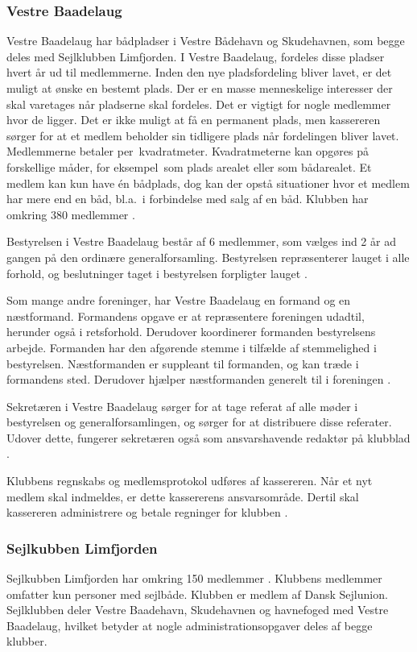 \subsubsection{Vestre Baadelaug}
Vestre Baadelaug har bådpladser i Vestre Bådehavn og Skudehavnen, som begge deles med Sejlklubben Limfjorden. I Vestre Baadelaug, fordeles disse pladser hvert år ud til medlemmerne. Inden den nye pladsfordeling bliver lavet, er det muligt at ønske en bestemt plads. Der er en masse menneskelige interesser der skal varetages når pladserne skal fordeles. Det er vigtigt for nogle medlemmer hvor de ligger. Det er ikke muligt at få en permanent plads, men kassereren sørger for at et medlem beholder sin tidligere plads når fordelingen bliver lavet. Medlemmerne betaler per\ kvadratmeter. Kvadratmeterne kan opgøres på forskellige måder, for eksempel\ som plads arealet eller som bådarealet. Et medlem kan kun have én bådplads, dog kan der opstå situationer hvor et medlem har mere end en båd, bl.a.\ i forbindelse med salg af en båd. Klubben har omkring 380 medlemmer \cite{int_vb_sl}.

Bestyrelsen i Vestre Baadelaug består af 6 medlemmer, som vælges ind 2 år ad gangen på den ordinære generalforsamling. Bestyrelsen repræsenterer lauget i alle forhold, og beslutninger taget i bestyrelsen forpligter lauget \cite{vestre_vedtagter}.

Som mange andre foreninger, har Vestre Baadelaug en formand og en næstformand. Formandens opgave er at repræsentere foreningen udadtil, herunder også i retsforhold. Derudover koordinerer formanden bestyrelsens arbejde. Formanden har den afgørende stemme i tilfælde af stemmelighed i bestyrelsen. Næstformanden er suppleant til formanden, og kan træde i formandens sted. Derudover hjælper næstformanden generelt til i foreningen \cite{vestre_vedtagter}.

Sekretæren i Vestre Baadelaug sørger for at tage referat af alle møder i bestyrelsen og generalforsamlingen, og sørger for at distribuere disse referater. Udover dette, fungerer sekretæren også som ansvarshavende redaktør på klubblad \cite{vestre_vedtagter}.

Klubbens regnskabs og medlemsprotokol udføres af kassereren. Når et nyt medlem skal indmeldes, er dette kassererens ansvarsområde. Dertil skal kassereren administrere og betale regninger for klubben \cite{int_vb_sl}.

\subsubsection{Sejlkubben Limfjorden}
Sejlkubben Limfjorden har omkring 150 medlemmer \cite{int_vb_sl}. Klubbens medlemmer omfatter kun personer med sejlbåde. Klubben er medlem af Dansk Sejlunion. Sejlklubben deler Vestre Baadehavn, Skudehavnen og havnefoged med Vestre Baadelaug, hvilket betyder at nogle administrationsopgaver deles af begge klubber. 

